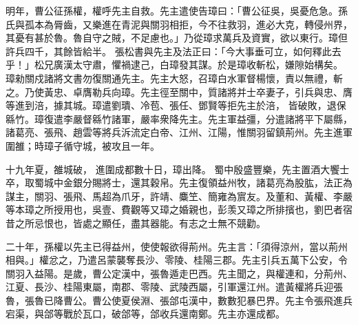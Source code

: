\begin{pinyinscope}
 
明年，曹公征孫權，權呼先主自救。先主遣使告璋曰：「曹公征吳，吳憂危急。孫氏與孤本為脣齒，又樂進在青泥與關羽相拒，今不往救羽，進必大克，轉侵州界，其憂有甚於魯。魯自守之賊，不足慮也。」乃從璋求萬兵及資實，欲以東行。璋但許兵四千，其餘皆給半。
 張松書與先主及法正曰：「今大事垂可立，如何釋此去乎！」松兄廣漢太守肅，懼禍逮己，白璋發其謀。於是璋收斬松，嫌隙始構矣。
 璋勑關戍諸將文書勿復關通先主。先主大怒，召璋白水軍督楊懷，責以無禮，斬之。乃使黃忠、卓膺勒兵向璋。先主徑至關中，質諸將并士卒妻子，引兵與忠、膺等進到涪，據其城。璋遣劉璝、冷苞、張任、鄧賢等拒先主於涪，
 皆破敗，退保緜竹。璋復遣李嚴督緜竹諸軍，嚴率衆降先主。先主軍益彊，分遣諸將平下屬縣，諸葛亮、張飛、趙雲等將兵泝流定白帝、江州、江陽，惟關羽留鎮荊州。先主進軍圍雒；時璋子循守城，被攻且一年。
 
 
十九年夏，雒城破，
 進圍成都數十日，璋出降。
 蜀中殷盛豐樂，先主置酒大饗士卒，取蜀城中金銀分賜將士，還其穀帛。先主復領益州牧，諸葛亮為股肱，法正為謀主，關羽、張飛、馬超為爪牙，許靖、麋笁、簡雍為賔友。及董和、黃權、李嚴等本璋之所授用也，吳壹、費觀等又璋之婚親也，彭羡又璋之所排擯也，劉巴者宿昔之所忌恨也，皆處之顯任，盡其器能。有志之士無不競勸。
 
 
 
 
 二十年，孫權以先主已得益州，使使報欲得荊州。先主言：「須得涼州，當以荊州相與。」權忿之，乃遣呂蒙襲奪長沙、零陵、桂陽三郡。先主引兵五萬下公安，令關羽入益陽。是歲，曹公定漢中，張魯遁走巴西。先主聞之，與權連和，分荊州、江夏、長沙、桂陽東屬，南郡、零陵、武陵西屬，引軍還江州。遣黃權將兵迎張魯，張魯已降曹公。曹公使夏侯淵、張郃屯漢中，數數犯暴巴界。先主令張飛進兵宕渠，與郃等戰於瓦口，破郃等，郃收兵還南鄭。先主亦還成都。
 

\end{pinyinscope}

